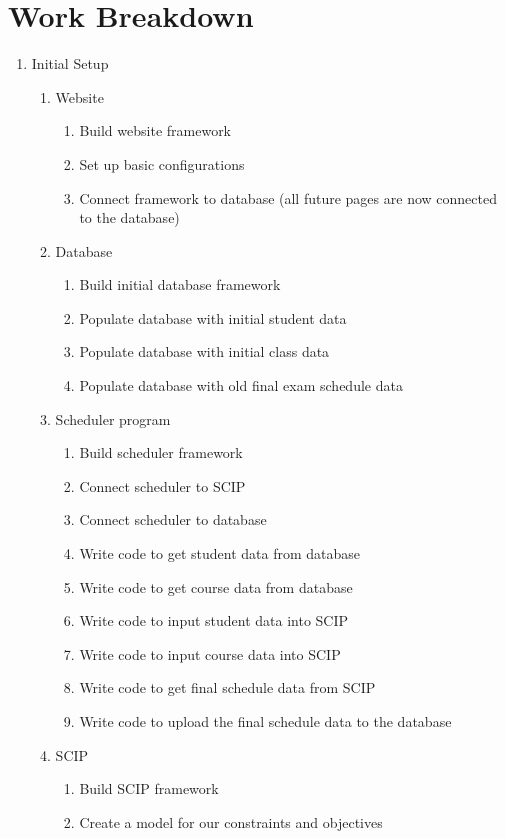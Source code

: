 \documentclass[11pt]{article}
\begin{document}
\section{Work Breakdown} %

\begin{enumerate}
\item Initial Setup
\begin{enumerate}
\item Website
\begin{enumerate}
\item Build website framework
\item Set up basic configurations
\item Connect framework to database (all future pages are now connected to the database)
\end{enumerate}
\item Database
\begin{enumerate}
\item Build initial database framework
\item Populate database with initial student data
\item Populate database with initial class data
\item Populate database with old final exam schedule data
\end{enumerate}
\item Scheduler program
\begin{enumerate}
\item Build scheduler framework
\item Connect scheduler to SCIP
\item Connect scheduler to database
\item Write code to get student data from database
\item Write code to get course data from database
\item Write code to input student data into SCIP
\item Write code to input course data into SCIP
\item Write code to get final schedule data from SCIP
\item Write code to upload the final schedule data to the database
\end{enumerate}
\item SCIP
\begin{enumerate}
\item Build SCIP framework
\item Create a model for our constraints and objectives
\end{enumerate}
\end{enumerate}


\end{enumerate}
\end{document}
